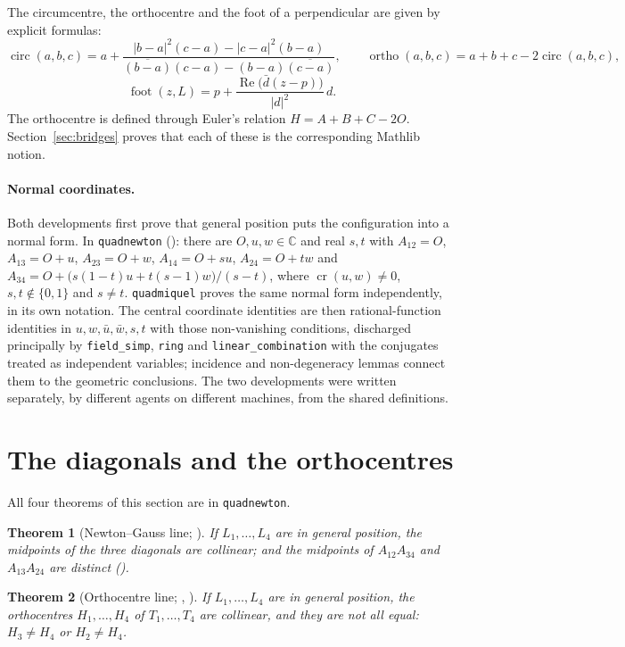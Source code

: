 \documentclass[11pt]{article}
\newtheorem{theorem}{Theorem}
\theoremstyle{definition}
\theoremstyle{remark}
\newcommand{\lean}[1]{\texttt{#1}}
\newcommand{\CC}{\mathbb{C}}
\begin{document}
The circumcentre, the orthocentre and the foot of a perpendicular are given by explicit formulas:
\[
  \operatorname{circ}(a,b,c)=a+\frac{|b-a|^2(c-a)-|c-a|^2(b-a)}{\overline{(b-a)}(c-a)-(b-a)\overline{(c-a)}},\qquad
  \operatorname{ortho}(a,b,c)=a+b+c-2\operatorname{circ}(a,b,c),
\]
\[
  \operatorname{foot}(z,L)=p+\frac{\operatorname{Re}\big(\bar d(z-p)\big)}{|d|^2}\,d .
\]
The orthocentre is defined through Euler's relation $H=A+B+C-2O$. Section~\ref{sec:bridges} proves
that each of these is the corresponding Mathlib notion.

\paragraph{Normal coordinates.} Both developments first prove that general position puts the
configuration into a normal form. In \lean{quadnewton} (): there are
$O,u,w\in\CC$ and real $s,t$ with $A_{12}=O$, $A_{13}=O+u$, $A_{23}=O+w$, $A_{14}=O+su$,
$A_{24}=O+tw$ and $A_{34}=O+\big(s(1-t)u+t(s-1)w\big)/(s-t)$, where $\operatorname{cr}(u,w)\neq0$,
$s,t\notin\{0,1\}$ and $s\neq t$. \lean{quadmiquel} proves the same normal form independently, in its own
notation. The central coordinate identities are then rational-function identities in
$u,w,\bar u,\bar w,s,t$ with those non-vanishing conditions, discharged principally by
\lean{field\_simp}, \lean{ring} and \lean{linear\_combination} with the conjugates treated as
independent variables; incidence and non-degeneracy lemmas connect them to the geometric conclusions. The two developments were written separately, by different agents on different
machines, from the shared definitions.

\section{The diagonals and the orthocentres}\label{sec:diag}

All four theorems of this section are in \lean{quadnewton}.

\begin{theorem}[Newton--Gauss line; ]\label{thm:newton}
If $L_1,\dots,L_4$ are in general position, the midpoints of the three diagonals are collinear; and
the midpoints of $A_{12}A_{34}$ and $A_{13}A_{24}$ are distinct ().
\end{theorem}

\begin{theorem}[Orthocentre line; , ]\label{thm:ortho}
If $L_1,\dots,L_4$ are in general position, the orthocentres $H_1,\dots,H_4$ of $T_1,\dots,T_4$ are
collinear, and they are not all equal: $H_3\neq H_4$ or $H_2\neq H_4$.
\end{theorem}
\end{document}
